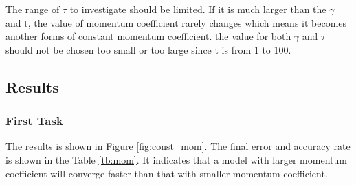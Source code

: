 \documentclass[11pt]{article}
\begin{document}
The range of $\tau$ to investigate should be limited. If it is much larger than the $\gamma$ and t, the value of momentum coefficient rarely changes which means it becomes another forms of constant momentum coefficient. the value for both $\gamma$ and $\tau$ should not be chosen too small or too large since t is from 1 to 100.

\subsection{Results}
\subsubsection{First Task}
The results is shown in Figure \ref{fig:const_mom}. The final error and accuracy rate is shown in the Table \ref{tb:mom}. It indicates that a model with larger momentum coefficient will converge faster than that with smaller momentum coefficient.
\end{document}
